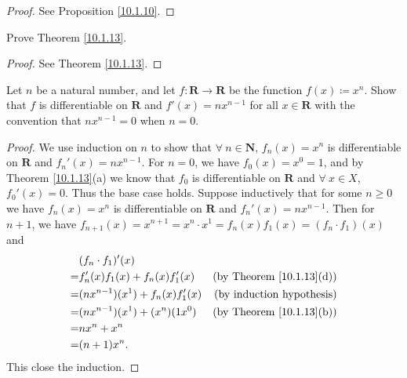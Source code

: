 \begin{proof}
    See Proposition \ref{10.1.10}.
\end{proof}

\begin{exercise}\label{ex 10.1.4}
    Prove Theorem \ref{10.1.13}.
\end{exercise}

\begin{proof}
    See Theorem \ref{10.1.13}.
\end{proof}

\begin{exercise}\label{ex 10.1.5}
    Let \(n\) be a natural number, and let \(f : \mathbf{R} \to \mathbf{R}\) be the function \(f(x) \coloneqq x^n\).
    Show that \(f\) is differentiable on \(\mathbf{R}\) and \(f'(x) = n x^{n - 1}\) for all \(x \in \mathbf{R}\) with the convention that \(n x^{n - 1} = 0\) when \(n = 0\).
\end{exercise}

\begin{proof}
    We use induction on \(n\) to show that \(\forall\ n \in \mathbf{N}\), \(f_n(x) = x^n\) is differentiable on \(\mathbf{R}\) and \(f_n'(x) = n x^{n - 1}\).
    For \(n = 0\), we have \(f_0(x) = x^0 = 1\), and by Theorem \ref{10.1.13}(a) we know that \(f_0\) is differentiable on \(\mathbf{R}\) and \(\forall\ x \in X\), \(f_0'(x) = 0\).
    Thus the base case holds.
    Suppose inductively that for some \(n \geq 0\) we have \(f_n(x) = x^n\) is differentiable on \(\mathbf{R}\) and \(f_n'(x) = n x^{n - 1}\).
    Then for \(n + 1\), we have \(f_{n + 1}(x) = x^{n + 1} = x^n \cdot x^1 = f_n(x) f_1(x) = (f_n \cdot f_1)(x)\) and
    \begin{align*}
          & (f_n \cdot f_1)'(x)                                                        \\
        = & f_n'(x) f_1(x) + f_n(x) f_1'(x)     & \text{(by Theorem \ref{10.1.13}(d))} \\
        = & (n x^{n - 1})(x^1) + f_n(x) f_1'(x) & \text{(by induction hypothesis)}     \\
        = & (n x^{n - 1})(x^1) + (x^n)(1 x^0)   & \text{(by Theorem \ref{10.1.13}(b))} \\
        = & n x^n + x^n                                                                \\
        = & (n + 1) x^n.
    \end{align*}
    This close the induction.
\end{proof}

